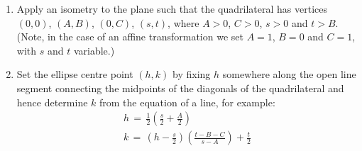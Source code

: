 \documentclass[preprint2]{aastex}
\begin{document}
\begin{enumerate}

\item Apply an isometry to the plane such that the quadrilateral has vertices $(0,0)$, $(A,B)$, $(0,C)$, $(s,t)$, where $A>0$, $C>0$, $s>0$ and $t>B$. (Note, in the case of an affine transformation we set $A=1$, $B=0$ and $C=1$, with $s$ and $t$ variable.)

\item Set the ellipse centre point $(h, k)$ by fixing $h$ somewhere along the open line segment connecting the midpoints of the diagonals of the quadrilateral and hence determine $k$ from the equation of a line, for example:
\begin{eqnarray}
h\,=\,\frac{1}{2}\left(\frac{s}{2}+\frac{A}{2}\right) \\
k\,=\,\left(h-\frac{s}{2}\right)\left(\frac{t-B-C}{s-A}\right) + \frac{t}{2}
\end{eqnarray}


\end{enumerate}
\end{document}
